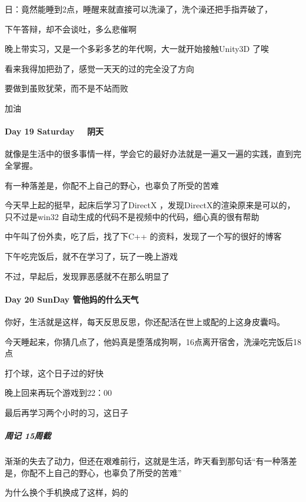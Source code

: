 \documentclass[UTF8,a4paper,8pt]{ctexart}
\begin{document}
        日：竟然能睡到2点，睡醒来就直接可以洗澡了，洗个澡还把手指弄破了，
        
        下午答辩，却不会谈吐，多么悲催啊
        
        晚上带实习，又是一个多彩多艺的年代啊，大一就开始接触Unity3D 了唉
        
        看来我得加把劲了，感觉一天天的过的完全没了方向
        
        
        要做到虽败犹荣，而不是不站而败
        
        加油
        
       \paragraph{Day 19 Saturday \ \ 阴天}
       
       就像是生活中的很多事情一样，学会它的最好办法就是一遍又一遍的实践，直到完全掌握。
       
       有一种落差是，你配不上自己的野心，也辜负了所受的苦难
       
       今天早上起的挺早，起床后学习了DirectX ，发现DirectX的渲染原来是可以的，只不过是win32 自动生成的代码不是视频中的代码，细心真的很有帮助
       
       中午叫了份外卖，吃了后，找了下C++ 的资料，发现了一个写的很好的博客
       
       下午吃完饭后，就不在学习了，玩了一晚上游戏
       
       不过，早起后，发现罪恶感就不在那么明显了
       
       \paragraph{Day 20 SunDay  \quad  管他妈的什么天气 }你好，生活就是这样，每天反思反思，你还配活在世上或配的上这身皮囊吗。
       
       今天睡起来，你猜几点了，他妈真是堕落成狗啊，16点离开宿舍，洗澡吃完饭后18点
       
       打个球，这个日子过的好快
       
       晚上回来再玩个游戏到22：00
       
       最后再学习两个小时的习，这日子
       
       \subparagraph{周记 15周截}
        
        渐渐的失去了动力，但还在艰难前行，这就是生活，昨天看到那句话“有一种落差是，你配不上自己的野心，也辜负了所受的苦难”
        
        为什么换个手机换成了这样，妈的
        
\end{document}
